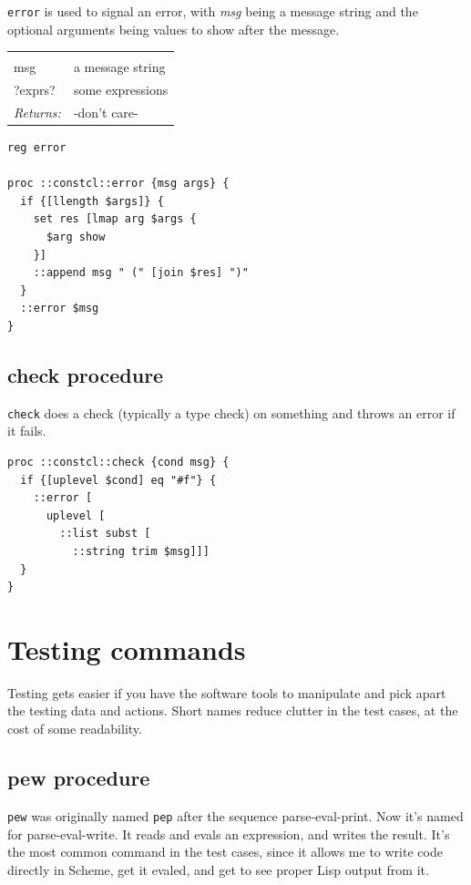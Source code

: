 \documentclass[twoside]{report}
\begin{document}
\texttt{error} is used to signal an error, with \emph{msg} being a message string and the optional arguments being values to show after the message.

\noindent\begin{tabular}{ |p{1.9cm} p{8cm}| }
\hline
\rowcolor[HTML]{CCCCCC} \multicolumn{2}{|l|}{\bf error (public)} \\
msg & a message string \\
?exprs? & some expressions \\
\textit{Returns:} & -don't care- \\
\hline
\end{tabular}

\begin{lstlisting}
reg error

proc ::constcl::error {msg args} {
  if {[llength $args]} {
    set res [lmap arg $args {
      $arg show
    }]
    ::append msg " (" [join $res] ")"
  }
  ::error $msg
}
\end{lstlisting}

\subsection{check procedure}
\label{check-procedure}

\texttt{check} does a check (typically a type check) on something and throws an error if it fails.

\begin{lstlisting}
proc ::constcl::check {cond msg} {
  if {[uplevel $cond] eq "#f"} {
    ::error [
      uplevel [
        ::list subst [
          ::string trim $msg]]]
  }
}
\end{lstlisting}

\section{Testing commands}
\label{testing-commands}

Testing gets easier if you have the software tools to manipulate and pick apart the testing data and actions. Short names reduce clutter in the test cases, at the cost of some readability.

\subsection{pew procedure}
\label{pew-procedure}

\texttt{pew} was originally named \texttt{pep} after the sequence parse-eval-print. Now it's named for parse-eval-write. It reads and evals an expression, and writes the result. It's the most common command in the test cases, since it allows me to write code directly in Scheme, get it evaled, and get to see proper Lisp output from it.
\end{document}
